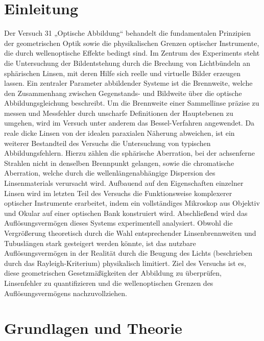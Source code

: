 \documentclass[12pt,a4paper,titlepage]{scrartcl}
\numberwithin{equation}{section}
\numberwithin{table}{section}
\numberwithin{figure}{section}
\begin{document}
\section{Einleitung}\label{sec:einleitung}
Der Versuch 31 „Optische Abbildung“ behandelt die fundamentalen Prinzipien der geometrischen Optik sowie die physikalischen Grenzen optischer Instrumente, die durch wellenoptische Effekte bedingt sind. Im Zentrum des Experiments steht die Untersuchung der Bildentstehung durch die Brechung von Lichtbündeln an sphärischen Linsen, mit deren Hilfe sich reelle und virtuelle Bilder erzeugen lassen.  Ein zentraler Parameter abbildender Systeme ist die Brennweite, welche den Zusammenhang zwischen Gegenstands- und Bildweite über die optische Abbildungsgleichung beschreibt. Um die Brennweite einer Sammellinse präzise zu messen und Messfehler durch unscharfe Definitionen der Hauptebenen zu umgehen, wird im Versuch unter anderem das Bessel-Verfahren angewendet. Da reale dicke Linsen von der idealen paraxialen Näherung abweichen, ist ein weiterer Bestandteil des Versuchs die Untersuchung von typischen Abbildungsfehlern. Hierzu zählen die sphärische Aberration, bei der achsenferne Strahlen nicht in denselben Brennpunkt gelangen, sowie die chromatische Aberration, welche durch die wellenlängenabhängige Dispersion des Linsenmaterials verursacht wird.  Aufbauend auf den Eigenschaften einzelner Linsen wird im letzten Teil des Versuchs die Funktionsweise komplexerer optischer Instrumente erarbeitet, indem ein vollständiges Mikroskop aus Objektiv und Okular auf einer optischen Bank konstruiert wird. Abschließend wird das Auflösungsvermögen dieses Systems experimentell analysiert. Obwohl die Vergrößerung theoretisch durch die Wahl entsprechender Linsenbrennweiten und Tubuslängen stark gesteigert werden könnte, ist das nutzbare Auflösungsvermögen in der Realität durch die Beugung des Lichts (beschrieben durch das Rayleigh-Kriterium) physikalisch limitiert. Ziel des Versuchs ist es, diese geometrischen Gesetzmäßigkeiten der Abbildung zu überprüfen, Linsenfehler zu quantifizieren und die wellenoptischen Grenzen des Auflösungsvermögens nachzuvollziehen.

\section{Grundlagen und Theorie}\label{sec:grundlagen}
\end{document}
